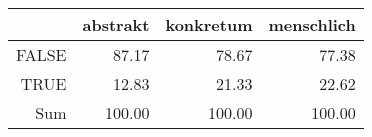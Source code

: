 \begin{tabular}{rrrr}
  \hline
 & abstrakt & konkretum & menschlich \\ 
  \hline
FALSE & 87.17 & 78.67 & 77.38 \\ 
  TRUE & 12.83 & 21.33 & 22.62 \\ 
  Sum & 100.00 & 100.00 & 100.00 \\ 
   \hline
\end{tabular}
